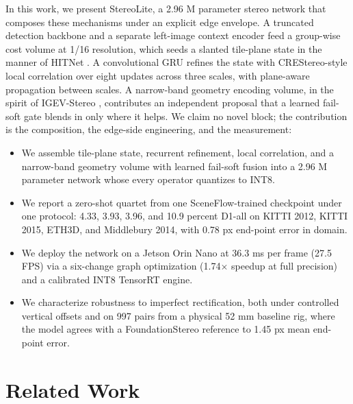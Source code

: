 \documentclass[conference]{IEEEtran}
\begin{document}
In this work, we present StereoLite, a 2.96 M parameter stereo network that composes these mechanisms under an explicit edge envelope. A truncated detection backbone and a separate left-image context encoder feed a group-wise cost volume \cite{guo2019gwcnet} at 1/16 resolution, which seeds a slanted tile-plane state in the manner of HITNet \cite{tankovich2021hitnet}. A convolutional GRU \cite{lipson2021raftstereo} refines the state with CREStereo-style local correlation \cite{li2022crestereo} over eight updates across three scales, with plane-aware propagation between scales. A narrow-band geometry encoding volume, in the spirit of IGEV-Stereo \cite{xu2023igev}, contributes an independent proposal that a learned fail-soft gate blends in only where it helps. We claim no novel block; the contribution is the composition, the edge-side engineering, and the measurement:
\begin{itemize}
\item We assemble tile-plane state, recurrent refinement, local correlation, and a narrow-band geometry volume with learned fail-soft fusion into a 2.96 M parameter network whose every operator quantizes to INT8.
\item We report a zero-shot quartet from one SceneFlow-trained checkpoint under one protocol: 4.33, 3.93, 3.96, and 10.9 percent D1-all on KITTI 2012, KITTI 2015, ETH3D, and Middlebury 2014, with 0.78 px end-point error in domain.
\item We deploy the network on a Jetson Orin Nano at 36.3 ms per frame (27.5 FPS) via a six-change graph optimization (1.74$\times$ speedup at full precision) and a calibrated INT8 TensorRT engine.
\item We characterize robustness to imperfect rectification, both under controlled vertical offsets and on 997 pairs from a physical 52 mm baseline rig, where the model agrees with a FoundationStereo reference to 1.45 px mean end-point error.
\end{itemize}

\section{Related Work}
\label{sec:related}
\end{document}
